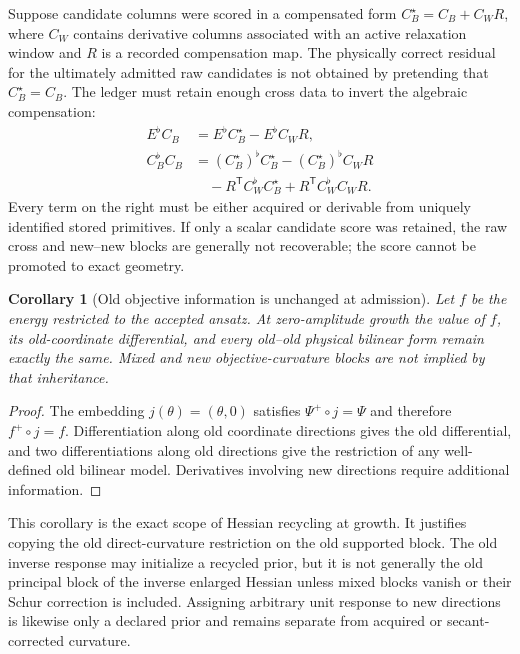 \documentclass[10pt,twocolumn]{article}
\newtheorem{corollary}[theorem]{Corollary}
\theoremstyle{definition}
\theoremstyle{remark}
\begin{document}
Suppose candidate columns were scored in a compensated form
$C_B^\star=C_B+C_WR$, where $C_W$ contains derivative columns associated with
an active relaxation window and $R$ is a recorded compensation map.  The
physically correct residual for the ultimately admitted raw candidates is
not obtained by pretending that $C_B^\star=C_B$.  The ledger must retain
enough cross data to invert the algebraic compensation:
\begin{align}
 E^\flat C_B
 &=E^\flat C_B^\star-E^\flat C_WR,\nonumber\\
 C_B^\flat C_B
 &=(C_B^\star)^\flat C_B^\star
 -(C_B^\star)^\flat C_WR\nonumber\\
 &\quad
 -R^{\mathsf T}C_W^\flat C_B^\star
 +R^{\mathsf T}C_W^\flat C_WR .
 \label{eq:appdecomp}
\end{align}
Every term on the right must be either acquired or derivable from uniquely
identified stored primitives.  If only a scalar candidate score was retained,
the raw cross and new--new blocks are generally not recoverable; the score
cannot be promoted to exact geometry.

\begin{corollary}[Old objective information is unchanged at admission]
\label{cor:oldobjective}
Let $f$ be the energy restricted to the accepted ansatz.  At zero-amplitude
growth the value of $f$, its old-coordinate differential, and every
old--old physical bilinear form remain exactly the same.  Mixed and new
objective-curvature blocks are not implied by that inheritance.
\end{corollary}
\begin{proof}
The embedding $j(\theta)=(\theta,0)$ satisfies
$\Psi^+\circ j=\Psi$ and therefore
$f^+\circ j=f$.  Differentiation along old coordinate directions gives the
old differential, and two differentiations along old directions give the
restriction of any well-defined old bilinear model.  Derivatives involving
new directions require additional information.
\end{proof}

This corollary is the exact scope of Hessian recycling at growth.  It justifies
copying the old direct-curvature restriction on the old supported block.  The
old inverse response may initialize a recycled prior, but it is not generally
the old principal block of the inverse enlarged Hessian unless mixed blocks
vanish or their Schur correction is included.  Assigning arbitrary unit
response to new directions is likewise only a declared prior and remains
separate from acquired or secant-corrected curvature.
\end{document}
